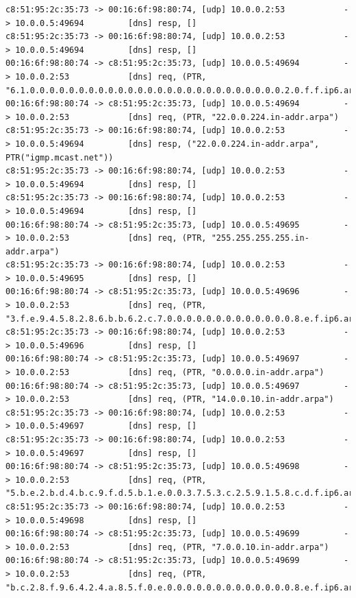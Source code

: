 \documentclass[11pt]{diazessay} %
\begin{document}
\begin{lstlisting}
c8:51:95:2c:35:73 -> 00:16:6f:98:80:74, [udp] 10.0.0.2:53            -> 10.0.0.5:49694         [dns] resp, []
c8:51:95:2c:35:73 -> 00:16:6f:98:80:74, [udp] 10.0.0.2:53            -> 10.0.0.5:49694         [dns] resp, []
00:16:6f:98:80:74 -> c8:51:95:2c:35:73, [udp] 10.0.0.5:49694         -> 10.0.0.2:53            [dns] req, (PTR, "6.1.0.0.0.0.0.0.0.0.0.0.0.0.0.0.0.0.0.0.0.0.0.0.0.0.0.0.2.0.f.f.ip6.arpa")
00:16:6f:98:80:74 -> c8:51:95:2c:35:73, [udp] 10.0.0.5:49694         -> 10.0.0.2:53            [dns] req, (PTR, "22.0.0.224.in-addr.arpa")
c8:51:95:2c:35:73 -> 00:16:6f:98:80:74, [udp] 10.0.0.2:53            -> 10.0.0.5:49694         [dns] resp, ("22.0.0.224.in-addr.arpa", PTR("igmp.mcast.net"))
c8:51:95:2c:35:73 -> 00:16:6f:98:80:74, [udp] 10.0.0.2:53            -> 10.0.0.5:49694         [dns] resp, []
c8:51:95:2c:35:73 -> 00:16:6f:98:80:74, [udp] 10.0.0.2:53            -> 10.0.0.5:49694         [dns] resp, []
00:16:6f:98:80:74 -> c8:51:95:2c:35:73, [udp] 10.0.0.5:49695         -> 10.0.0.2:53            [dns] req, (PTR, "255.255.255.255.in-addr.arpa")
c8:51:95:2c:35:73 -> 00:16:6f:98:80:74, [udp] 10.0.0.2:53            -> 10.0.0.5:49695         [dns] resp, []
00:16:6f:98:80:74 -> c8:51:95:2c:35:73, [udp] 10.0.0.5:49696         -> 10.0.0.2:53            [dns] req, (PTR, "3.f.e.9.4.5.8.2.8.6.b.b.6.2.c.7.0.0.0.0.0.0.0.0.0.0.0.0.0.8.e.f.ip6.arpa")
c8:51:95:2c:35:73 -> 00:16:6f:98:80:74, [udp] 10.0.0.2:53            -> 10.0.0.5:49696         [dns] resp, []
00:16:6f:98:80:74 -> c8:51:95:2c:35:73, [udp] 10.0.0.5:49697         -> 10.0.0.2:53            [dns] req, (PTR, "0.0.0.0.in-addr.arpa")
00:16:6f:98:80:74 -> c8:51:95:2c:35:73, [udp] 10.0.0.5:49697         -> 10.0.0.2:53            [dns] req, (PTR, "14.0.0.10.in-addr.arpa")
c8:51:95:2c:35:73 -> 00:16:6f:98:80:74, [udp] 10.0.0.2:53            -> 10.0.0.5:49697         [dns] resp, []
c8:51:95:2c:35:73 -> 00:16:6f:98:80:74, [udp] 10.0.0.2:53            -> 10.0.0.5:49697         [dns] resp, []
00:16:6f:98:80:74 -> c8:51:95:2c:35:73, [udp] 10.0.0.5:49698         -> 10.0.0.2:53            [dns] req, (PTR, "5.b.e.2.b.d.4.b.c.9.f.d.5.b.1.e.0.0.3.7.5.3.c.2.5.9.1.5.8.c.d.f.ip6.arpa")
c8:51:95:2c:35:73 -> 00:16:6f:98:80:74, [udp] 10.0.0.2:53            -> 10.0.0.5:49698         [dns] resp, []
00:16:6f:98:80:74 -> c8:51:95:2c:35:73, [udp] 10.0.0.5:49699         -> 10.0.0.2:53            [dns] req, (PTR, "7.0.0.10.in-addr.arpa")
00:16:6f:98:80:74 -> c8:51:95:2c:35:73, [udp] 10.0.0.5:49699         -> 10.0.0.2:53            [dns] req, (PTR, "b.c.2.8.f.9.6.4.2.4.a.8.5.f.0.e.0.0.0.0.0.0.0.0.0.0.0.0.0.8.e.f.ip6.arpa")
\end{lstlisting}
\end{document}
